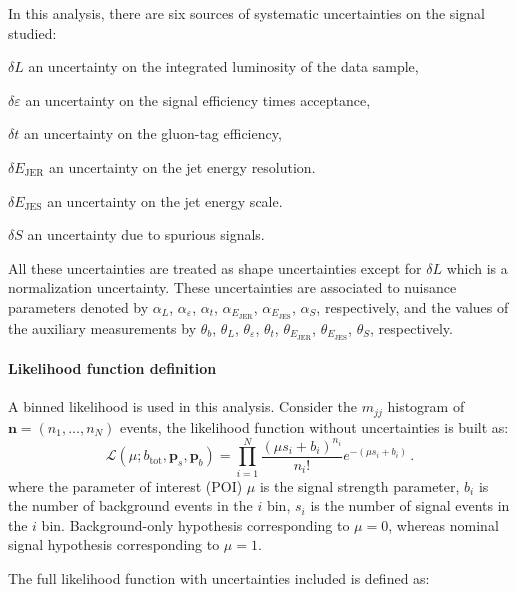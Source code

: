 In this analysis, there are six sources of systematic uncertainties on the signal studied: 

\begin{description}
\item $\delta L$ an uncertainty on the integrated luminosity of the data
  sample,
\item $\delta\varepsilon$ an uncertainty on the signal efficiency times
  acceptance, 
\item $\delta t$ an uncertainty on the gluon-tag efficiency,
\item $\delta E_\mathrm{JER}$ an uncertainty on the jet energy
  resolution.
\item $\delta E_\mathrm{JES}$ an uncertainty on the jet energy scale.
\item $\delta S$ an uncertainty due to spurious signals.
\end{description}

\noindent
All these uncertainties are treated as shape uncertainties except for
$\delta L$ which is a normalization uncertainty.
These uncertainties are associated to nuisance parameters denoted by
$\alpha_L$,
$\alpha_\varepsilon$, $\alpha_t$, $\alpha_{E_\mathrm{JER}}$,
$\alpha_{E_\mathrm{JES}}$, $\alpha_S$, 
respectively, and the values of the auxiliary measurements by 
$\theta_b$, $\theta_L$, $\theta_\varepsilon$, $\theta_t$,
$\theta_{E_\mathrm{JER}}$, $\theta_{E_\mathrm{JES}}$, $\theta_S$, respectively.


\paragraph{Likelihood function definition}\mbox{}\par

A binned likelihood is used in this analysis. Consider the $m_{jj}$ histogram of $\bm{n} = (n_1, \ldots, n_N)$
events, the likelihood function without uncertainties is built as:
\begin{equation}
\mathcal{L}(\mu;b_\mathrm{tot},\bm{p}_s,\bm{p}_b) = \prod_{i=1}^N \frac{(\mu s_i +
b_i)^{n_i}}{n_i!} e^{-(\mu s_i + b_i)}\, .
\end{equation}
\noindent
where the parameter of interest (POI) $\mu$ is the signal strength
parameter, $b_i$ is the number of background events in the $i$ bin, $s_i$ is the number of signal events in the $i$ bin. Background-only
hypothesis corresponding to $\mu = 0$, whereas nominal signal hypothesis corresponding to $\mu = 1$.

The full likelihood function with uncertainties included is defined as:

